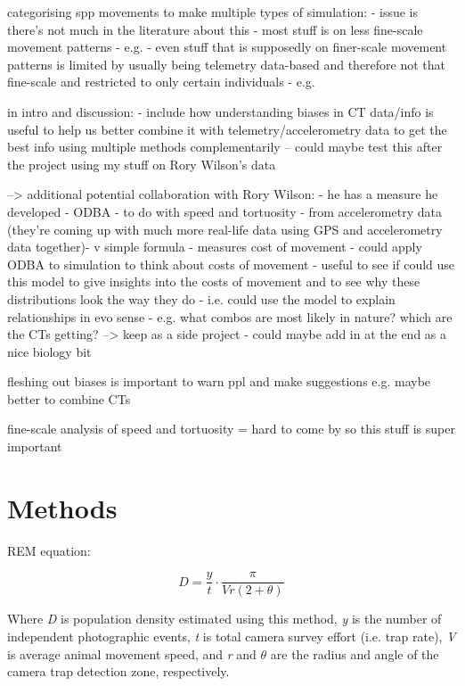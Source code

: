 \documentclass[11pt]{article}
\begin{document}
	
	
	categorising spp movements to make multiple types of simulation:
	- issue is there's not much in the literature about this
	- most stuff is on less fine-scale movement patterns - e.g. \cite{shaw2020causes}
	- even stuff that is supposedly on finer-scale movement patterns is limited by usually being telemetry data-based and therefore not that fine-scale and restricted to only certain individuals 
		- e.g. \cite{leblond2010drives}
	
	
	
	in intro and discussion: 
	- include how understanding biases in CT data/info is useful to help us better combine it with telemetry/accelerometry data to get the best info using multiple methods complementarily
	-- could maybe test this after the project using my stuff on Rory Wilson's data 
	
	--> additional potential collaboration with Rory Wilson:
	- he has a measure he developed - ODBA - to do with speed and tortuosity - from accelerometry data (they're coming up with much more real-life data using GPS and accelerometry data together)- v simple formula
	- measures cost of movement
	- could apply ODBA to simulation to think about costs of movement
	- useful to see if could use this model to give insights into the costs of movement and to see why these distributions look the way they do - i.e. could use the model to explain relationships in evo sense
	- e.g. what combos are most likely in nature? which are the CTs getting?
	--> keep as a side project - could maybe add in at the end as a nice biology bit
	
	
	fleshing out biases is important to warn ppl and make suggestions e.g. maybe better to combine CTs
	
	fine-scale analysis of speed and tortuosity = hard to come by so this stuff is super important
	
	
	
	
	\section{Methods}
	
	
	REM equation:
	
		\begin{equation}
			D = \frac{y}{t} \cdot \frac{\pi}{Vr(2 + \theta)}
	\end{equation}
	
	Where \textit{D} is population density estimated using this method, \textit{y} is the number of independent photographic events, \textit{t} is total camera survey effort (i.e. trap rate), \textit{V} is average animal movement speed, and \textit{r} and \begin{math}\theta\end{math} are the radius and angle of the camera trap detection zone, respectively. 
	
\end{document}

